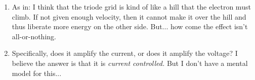 \documentclass[11pt, oneside]{amsart}
\begin{document}
\begin{enumerate}
  \item {} As in: I think that
  the triode grid is kind of like a hill that the electron must climb.
  If not given enough velocity, then it cannot make it over the hill and
  thus liberate more energy on the other side. But... how come the
  effect isn't all-or-nothing.

  \item {} Specifically, does
  it amplify the current, or does it amplify the voltage? I believe the
  answer is that it is \emph{current controlled.} But I don't have a
  mental model for this...
\end{enumerate}
\end{document}
